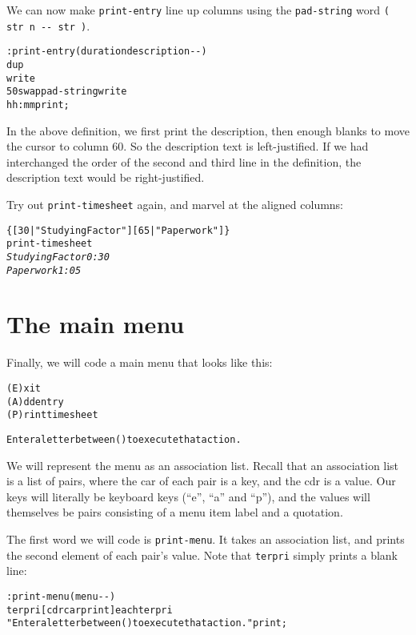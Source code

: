 \documentclass[english]{book}
\begin{document}
We can now make \texttt{print-entry} line up columns using the \texttt{pad-string}
word \texttt{( str n -{}- str )}.

\begin{alltt}
: print-entry ( duration description -{}- )
    dup
    write
    50 swap pad-string write 
    hh:mm print ;
\end{alltt}

In the above definition, we first print the description, then enough
blanks to move the cursor to column 60. So the description text is
left-justified. If we had interchanged the order of the second and
third line in the definition, the description text would be right-justified.

Try out \texttt{print-timesheet} again, and marvel at the aligned
columns:

\begin{alltt}
\{ {[} 30 | "Studying Factor" {]} {[} 65 | "Paperwork" {]} \}
print-timesheet
\emph{Studying Factor                                   0:30}
\emph{Paperwork                                         1:05}
\end{alltt}

\section{The main menu}

Finally, we will code a main menu that looks like this:

\begin{alltt}

(E)xit
(A)dd entry
(P)rint timesheet

Enter a letter between ( ) to execute that action.
\end{alltt}

We will represent the menu as an association list. Recall that an association list is a list of pairs, where the car of each pair is a key, and the cdr is a value. Our keys will literally be keyboard keys (``e'', ``a'' and ``p''), and the values will themselves be pairs consisting of a menu item label and a quotation.

The first word we will code is \texttt{print-menu}. It takes an association list, and prints the second element of each pair's value. Note that \texttt{terpri} simply prints a blank line:

\begin{alltt}
: print-menu ( menu -{}- )
    terpri {[} cdr car print {]} each terpri
    "Enter a letter between ( ) to execute that action." print ;
\end{alltt}
\end{document}
